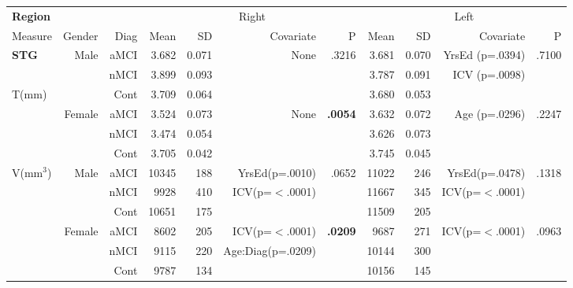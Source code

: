 \documentclass[12pt]{article}\usepackage[]{graphicx}\usepackage[]{color}
\newcommand\T{\rule{0pt}{2.6ex}}
\newcommand\B{\rule[-1.2ex]{0pt}{0pt}}
\begin{document}
\newpage
\begin{sidewaystable}
	\centering
	\footnotesize
	\begin{tabular}{l|rr|rrrr|rrrr}
	\hline
	\textbf{Region} & & & \multicolumn{4}{c}{Right} \T & \multicolumn{4}{|c}{Left} \\
	\multicolumn{1}{l|}{Measure} \T\B & Gender & Diag & Mean & SD & Covariate & P & Mean & SD & Covariate & P \\
	\hline\hline
	\textbf{STG} \T & \multirow{3}{*}{Male} & aMCI & 3.682 & 0.071 & None & .3216 & 3.681 & 0.070	 & YrsEd (p=.0394) & .7100 \\
							&						& nMCI & 3.899 & 0.093  & &  & 3.787 & 0.091  & ICV (p=.0098)		& \\
	\multirow{2}{*}{T(mm)}						&						& Cont & 3.709 & 0.064  & & & 3.680 &  0.053 & & \\\cline{2-11}
							&	\multirow{3}{*}{Female}	& aMCI\T & 3.524 & 0.073 & None & \textbf{.0054} & 3.632 &0.072  & Age (p=.0296) & .2247 \\
							&						& nMCI & 3.474 & 0.054  & & & 3.626 & 0.073 & & \\
							&						& Cont & 3.705 & 0.042  & & & 3.745 &0.045  & & \\						
	\hline
	\multirow{6}{*}{V(mm$^3$)} \T & \multirow{3}{*}{Male} & aMCI\T & 10345 &188 & YrsEd(p=.0010) & .0652 & 11022	& 246	& YrsEd(p=.0478) & .1318 \\
							&						& nMCI &9928 &410  & ICV(p=$<$.0001)& & 11667&345 & ICV(p=$<$.0001) & \\
							&						& Cont &10651 &175  & 		& &11509&205 & & \\\cline{2-11}
							&	\multirow{3}{*}{Female}	& aMCI\T &8602	 & 205 & ICV(p=$<$.0001) & \textbf{.0209} & 9687&271 & ICV(p=$<$.0001) & .0963 \\
							&						& nMCI &9115 & 220 & Age:Diag(p=.0209) & & 10144 & 300 & 		& \\
							&						& Cont &9787 &134  & & & 10156 & 145	& 		&  \\


\end{tabular}
\end{sidewaystable}
\end{document}
